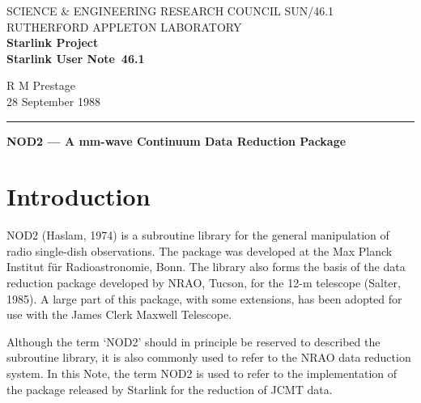 \pagestyle{myheadings}

\newcommand{\stardoccategory}  {Starlink User Note}
\newcommand{\stardocinitials}  {SUN}
\newcommand{\stardocnumber}    {46.1}
\newcommand{\stardocauthors}   {R M Prestage}
\newcommand{\stardocdate}      {28 September 1988}
\newcommand{\stardoctitle}     {NOD2 --- A mm-wave Continuum Data Reduction
                                Package}

\newcommand{\stardocname}{\stardocinitials /\stardocnumber}
\markright{\stardocname}
\setlength{\textwidth}{160mm}
\setlength{\textheight}{240mm}
\setlength{\topmargin}{-5mm}
\setlength{\oddsidemargin}{0mm}
\setlength{\evensidemargin}{0mm}
\setlength{\parindent}{0mm}
\setlength{\parskip}{\medskipamount}
\setlength{\unitlength}{1mm}


\thispagestyle{empty}
SCIENCE \& ENGINEERING RESEARCH COUNCIL \hfill \stardocname\\
RUTHERFORD APPLETON LABORATORY\\
{\large\bf Starlink Project\\}
{\large\bf \stardoccategory\ \stardocnumber}
\begin{flushright}
\stardocauthors\\
\stardocdate
\end{flushright}
\vspace{-4mm}
\rule{\textwidth}{0.5mm}
\vspace{5mm}
\begin{center}
{\Large\bf \stardoctitle}
\end{center}
\vspace{5mm}

\section{Introduction}

NOD2 (Haslam, 1974) is a subroutine library for the general
manipulation of radio single-dish observations. The package was
developed at the Max Planck Institut f\"{u}r Radioastronomie, Bonn. The
library also forms the basis of the data reduction
package developed by NRAO, Tucson, for the 12-m telescope (Salter, 1985).
A large part of this package, with some extensions, has been adopted for
use with the James Clerk Maxwell Telescope.

Although the term `NOD2' should in principle be reserved to described
the subroutine library, it is also commonly used to refer to the NRAO
data reduction system. In this Note, the term NOD2 is used to refer to
the implementation of the package released by Starlink for the reduction
of JCMT data.

